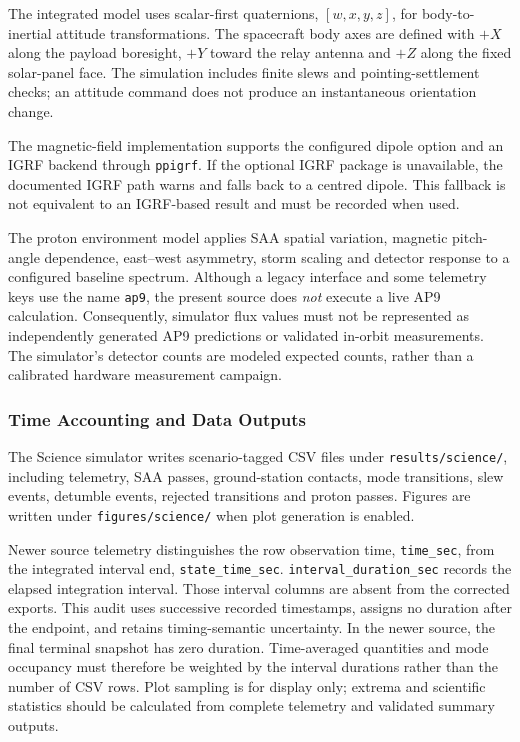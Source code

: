 The integrated model uses scalar-first quaternions, $[w,x,y,z]$, for body-to-inertial attitude transformations. The spacecraft body axes are defined with $+X$ along the payload boresight, $+Y$ toward the relay antenna and $+Z$ along the fixed solar-panel face. The simulation includes finite slews and pointing-settlement checks; an attitude command does not produce an instantaneous orientation change.

The magnetic-field implementation supports the configured dipole option and an IGRF backend through \texttt{ppigrf}. If the optional IGRF package is unavailable, the documented IGRF path warns and falls back to a centred dipole. This fallback is not equivalent to an IGRF-based result and must be recorded when used.

The proton environment model applies SAA spatial variation, magnetic pitch-angle dependence, east--west asymmetry, storm scaling and detector response to a configured baseline spectrum. Although a legacy interface and some telemetry keys use the name \texttt{ap9}, the present source does \emph{not} execute a live AP9 calculation. Consequently, simulator flux values must not be represented as independently generated AP9 predictions or validated in-orbit measurements. The simulator's detector counts are modeled expected counts, rather than a calibrated hardware measurement campaign.

\subsubsection{Time Accounting and Data Outputs}
\label{app:data-reproduction}
The Science simulator writes scenario-tagged CSV files under \texttt{results/science/}, including telemetry, SAA passes, ground-station contacts, mode transitions, slew events, detumble events, rejected transitions and proton passes. Figures are written under \texttt{figures/science/} when plot generation is enabled.

Newer source telemetry distinguishes the row observation time, \texttt{time\_sec}, from the integrated interval end, \texttt{state\_time\_sec}. \texttt{interval\_duration\_sec} records the elapsed integration interval. Those interval columns are absent from the corrected exports. This audit uses successive recorded timestamps, assigns no duration after the endpoint, and retains timing-semantic uncertainty. In the newer source, the final terminal snapshot has zero duration. Time-averaged quantities and mode occupancy must therefore be weighted by the interval durations rather than the number of CSV rows. Plot sampling is for display only; extrema and scientific statistics should be calculated from complete telemetry and validated summary outputs.

